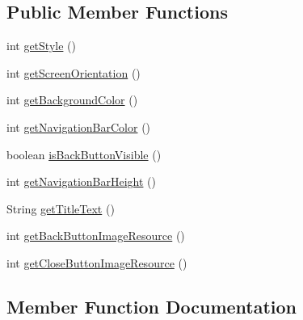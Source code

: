 \subsection*{Public Member Functions}
\begin{DoxyCompactItemize}
\item 
int \hyperlink{classcom_1_1toast_1_1android_1_1gamebase_1_1_gamebase_web_view_configuration_ab620af7635945a9f09b276050dda7492}{get\+Style} ()
\item 
int \hyperlink{classcom_1_1toast_1_1android_1_1gamebase_1_1_gamebase_web_view_configuration_ad3f0b6cf2dbdd22e77f15df451136811}{get\+Screen\+Orientation} ()
\item 
int \hyperlink{classcom_1_1toast_1_1android_1_1gamebase_1_1_gamebase_web_view_configuration_ab61d9a9b7b58dce443b6b47dcbb9cf19}{get\+Background\+Color} ()
\item 
int \hyperlink{classcom_1_1toast_1_1android_1_1gamebase_1_1_gamebase_web_view_configuration_a7732a29e0701232521b32c38031de3f6}{get\+Navigation\+Bar\+Color} ()
\item 
boolean \hyperlink{classcom_1_1toast_1_1android_1_1gamebase_1_1_gamebase_web_view_configuration_afb400af15d705c47c1c785c40c7860df}{is\+Back\+Button\+Visible} ()
\item 
int \hyperlink{classcom_1_1toast_1_1android_1_1gamebase_1_1_gamebase_web_view_configuration_ab90e54c9c780f4c6ae920be141987d0e}{get\+Navigation\+Bar\+Height} ()
\item 
String \hyperlink{classcom_1_1toast_1_1android_1_1gamebase_1_1_gamebase_web_view_configuration_a1127c3ec89551276f9cd97894e9cd40f}{get\+Title\+Text} ()
\item 
int \hyperlink{classcom_1_1toast_1_1android_1_1gamebase_1_1_gamebase_web_view_configuration_a707f3ced9dfcc025c3f90447bab9cbdb}{get\+Back\+Button\+Image\+Resource} ()
\item 
int \hyperlink{classcom_1_1toast_1_1android_1_1gamebase_1_1_gamebase_web_view_configuration_a2991e38ffc39b7ed326793daf75ef22e}{get\+Close\+Button\+Image\+Resource} ()
\end{DoxyCompactItemize}


\subsection{Member Function Documentation}
\mbox{\label{classcom_1_1toast_1_1android_1_1gamebase_1_1_gamebase_web_view_configuration_a707f3ced9dfcc025c3f90447bab9cbdb}} 
